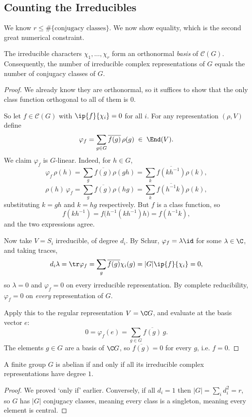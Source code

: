 \subsection{Counting the Irreducibles}

We know $r \leq \#\{\text{conjugacy classes}\}$. We now show equality, which is the second great numerical constraint.

\begin{theorem}
	The irreducible characters $\chi_1, \dots, \chi_r$ form an orthonormal \emph{basis} of $\mathcal{C}(G)$. Consequently, the number of irreducible complex representations of $G$ equals the number of conjugacy classes of $G$.
\end{theorem}
\begin{proof}
	We already know they are orthonormal, so it suffices to show that the only class function orthogonal to all of them is $0$.

	So let $f \in \mathcal{C}(G)$ with $\ip{f}{\chi_i} = 0$ for all $i$. For any representation $(\rho, V)$ define
	$$\varphi_f = \sum_{g\in G}\overline{f(g)}\,\rho(g) \; \in \; \End(V).$$
	We claim $\varphi_f$ is $G$-linear. Indeed, for $h \in G$,
	$$\varphi_f\,\rho(h) = \sum_g \overline{f(g)}\rho(gh) = \sum_k \overline{f(kh^{-1})}\rho(k),$$
	$$\rho(h)\,\varphi_f = \sum_g \overline{f(g)}\rho(hg) = \sum_k\overline{f(h^{-1}k)}\rho(k),$$
	substituting $k = gh$ and $k = hg$ respectively. But $f$ is a class function, so
	$$f(kh^{-1}) = f\big(h^{-1}(kh^{-1})h\big) = f(h^{-1}k),$$
	and the two expressions agree.

	Now take $V = S_i$ irreducible, of degree $d_i$. By Schur, $\varphi_f = \lambda\id$ for some $\lambda \in \C$, and taking traces,
	$$d_i \lambda = \tr\varphi_f = \sum_g \overline{f(g)}\chi_i(g) = |G|\ip{f}{\chi_i} = 0,$$
	so $\lambda = 0$ and $\varphi_f = 0$ on every irreducible representation. By complete reducibility, $\varphi_f = 0$ on \emph{every} representation of $G$.

	Apply this to the regular representation $V = \C G$, and evaluate at the basis vector $e$:
	$$0 = \varphi_f(e) = \sum_{g\in G}\overline{f(g)}\, g.$$
	The elements $g \in G$ are a basis of $\C G$, so $\overline{f(g)} = 0$ for every $g$, i.e. $f = 0$.
\end{proof}

\begin{corollary}
	A finite group $G$ is abelian if and only if all its irreducible complex representations have degree $1$.
\end{corollary}
\begin{proof}
	We proved `only if' earlier. Conversely, if all $d_i = 1$ then $|G| = \sum_i d_i^2 = r$, so $G$ has $|G|$ conjugacy classes, meaning every class is a singleton, meaning every element is central.
\end{proof}

